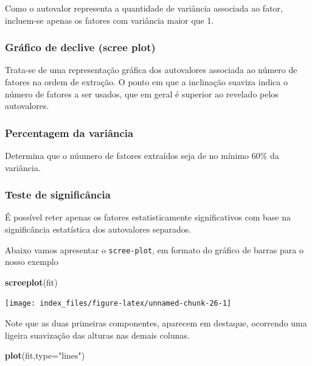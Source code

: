 \documentclass[12pt,brazil,oneside]{book}
\newenvironment{Shaded}{\begin{snugshade}}{\end{snugshade}}
\newcommand{\DataTypeTok}[1]{\textcolor[rgb]{0.13,0.29,0.53}{#1}}
\newcommand{\KeywordTok}[1]{\textcolor[rgb]{0.13,0.29,0.53}{\textbf{#1}}}
\newcommand{\NormalTok}[1]{#1}
\newcommand{\StringTok}[1]{\textcolor[rgb]{0.31,0.60,0.02}{#1}}
\begin{document}
Como o autovalor representa a quantidade de variância associada ao fator, incluem-se
apenas os fatores com variância maior que 1.

\hypertarget{grafico-de-declive-scree-plot}{%
\subsubsection{\texorpdfstring{Gráfico de declive (\textbf{scree plot})}{Gráfico de declive (scree plot)}}\label{grafico-de-declive-scree-plot}}

Trata-se de uma representação gráfica dos autovalores associada ao número de fatores na
ordem de extração. O ponto em que a inclinação suaviza indica o número de fatores a ser usados,
que em geral é superior ao revelado pelos autovalores.

\hypertarget{percentagem-da-variancia}{%
\subsubsection{Percentagem da variância}\label{percentagem-da-variancia}}

Determina que o núumero de fatores extraídos seja de no mínimo 60\% da variância.

\hypertarget{teste-de-significancia}{%
\subsubsection{Teste de significância}\label{teste-de-significancia}}

É possível reter apenas os fatores estatisticamente significativos com base na significância estatística dos autovalores separados.

Abaixo vamos apresentar o \texttt{scree-plot}, em formato do gráfico de barras para o nosso exemplo

\begin{Shaded}
\begin{Highlighting}[]
\KeywordTok{screeplot}\NormalTok{(fit)}
\end{Highlighting}
\end{Shaded}

\begin{center}\texttt{[image: index\_files/figure-latex/unnamed-chunk-26-1]} \end{center}

Note que as duas primeiras componentes, aparecem em destaque, ocorrendo uma ligeira suavização das alturas nas demais colunas.

\begin{Shaded}
\begin{Highlighting}[]
\KeywordTok{plot}\NormalTok{(fit,}\DataTypeTok{type=}\StringTok{"lines"}\NormalTok{)}
\end{Highlighting}
\end{Shaded}
\end{document}
